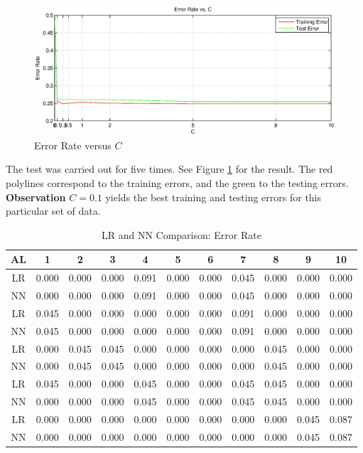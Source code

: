 \documentclass{article}
\begin{document}
\begin{figure}[h!]
	\centering
	\includegraphics[width=0.8\paperwidth]{ploterr.eps}
	\caption{Error Rate versus $C$}\label{errorrate-c}
\end{figure}

 The test was carried out for five times. 
See Figure \ref{errorrate-c} for the result. The red polylines correspond to the training errors, 
and the green to the testing errors. \\
{\bf Observation} $C=0.1$ yields the best training and testing errors for this particular set of data.

\begin{table}
	\centering
	\caption{LR and NN Comparison: Error Rate}\vspace{4pt}\label{lr-nn}
	\begin{tabular}{ccccccccccc} \toprule
	   AL & 1 & 2 & 3 & 4 & 5 & 6 & 7 & 8 & 9 & 10 \\ \midrule
	   LR & 0.000 & 0.000 & 0.000 & 0.091 & 0.000 & 0.000 & 0.045 & 0.000 & 0.000 & 0.000 \\
	   NN & 0.000 & 0.000 & 0.000 & 0.091 & 0.000 & 0.000 & 0.045 & 0.000 & 0.000 & 0.000 \\ \midrule
	   LR & 0.045 & 0.000 & 0.000 & 0.000 & 0.000 & 0.000 & 0.091 & 0.000 & 0.000 & 0.000 \\
	   NN & 0.045 & 0.000 & 0.000 & 0.000 & 0.000 & 0.000 & 0.091 & 0.000 & 0.000 & 0.000 \\ \midrule
	   LR & 0.000 & 0.045 & 0.045 & 0.000 & 0.000 & 0.000 & 0.000 & 0.045 & 0.000 & 0.000 \\
	   NN & 0.000 & 0.045 & 0.045 & 0.000 & 0.000 & 0.000 & 0.000 & 0.045 & 0.000 & 0.000 \\ \midrule
	   LR & 0.045 & 0.000 & 0.000 & 0.045 & 0.000 & 0.000 & 0.045 & 0.045 & 0.000 & 0.000 \\
	   NN & 0.000 & 0.000 & 0.000 & 0.045 & 0.000 & 0.000 & 0.045 & 0.045 & 0.000 & 0.000 \\ \midrule
	   LR & 0.000 & 0.000 & 0.000 & 0.000 & 0.000 & 0.000 & 0.000 & 0.000 & 0.045 & 0.087 \\
	   NN & 0.000 & 0.000 & 0.000 & 0.000 & 0.000 & 0.000 & 0.000 & 0.000 & 0.045 & 0.087 \\ \bottomrule
	\end{tabular}
\end{table}
\end{document}
